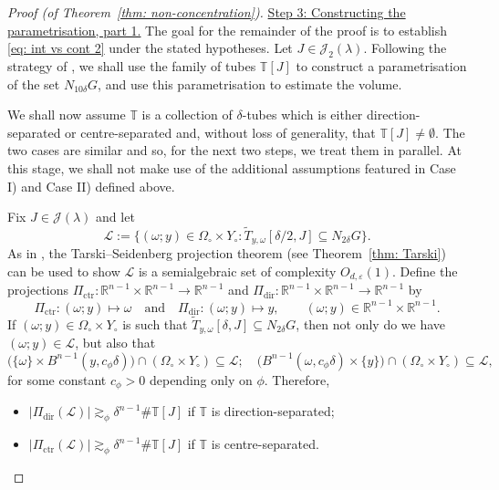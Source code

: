 \documentclass[reqno]{amsart}
\numberwithin{equation}{section}
\newcommand{\R}{\mathbb{R}}
\newcommand{\T}{\mathbb{T}}
\newcommand{\cJ}{\mathcal{J}}
\newcommand{\cL}{\mathcal{L}}
\theoremstyle{plain}
\theoremstyle{definition}
\newcommand{\ctr}{\mathrm{ctr}}
\newcommand{\dir}{\mathrm{dir}}
\begin{document}
\begin{proof}[Proof (of Theorem~\ref{thm: non-concentration})]



\noindent \underline{Step 3: Constructing the parametrisation, part 1.} The goal for the remainder of the proof is to establish \eqref{eq: int vs cont 2} under the stated hypotheses. Let $J\in \cJ_2(\lambda)$. Following the strategy of \cite{KR2018}, we shall use the family of tubes $\T[J]$ to construct a parametrisation of the set $N_{10\delta} G$, and use this parametrisation to estimate the volume. 

We shall now assume $\T$ is a collection of $\delta$-tubes which is either direction-separated or centre-separated and, without loss of generality, that $\T[J] \neq \emptyset$. The two cases are similar and so, for the next two steps, we treat them in parallel. At this stage, we shall not make use of the additional assumptions featured in Case I) and Case II) defined above. 

Fix $J \in \cJ(\lambda)$ and let
    \begin{equation*}
        \cL:=\big\{(\omega; y)\in \Omega_{\circ} \times Y_{\circ} : \widetilde{T}_{y,\omega}[\delta/2, J]\subseteq N_{2\delta} G\big\}.
    \end{equation*}
    As in \cite{KR2018}, the Tarski--Seidenberg projection theorem (see Theorem~\ref{thm: Tarski}) can be used to show $\cL$ is a semialgebraic set of complexity $O_{d, \varepsilon}(1)$. Define the projections $\Pi_{\ctr} \colon \R^{n-1} \times \R^{n-1} \to \R^{n-1}$ and $\Pi_{\dir} \colon \R^{n-1} \times \R^{n-1} \to \R^{n-1}$ by
    \begin{equation*}
     \Pi_{\ctr} \colon (\omega; y) \mapsto \omega \quad \textrm{and} \quad \Pi_{\dir} \colon (\omega; y) \mapsto y, \qquad  (\omega; y) \in  \R^{n-1} \times \R^{n-1}.
    \end{equation*}
    If $(\omega; y) \in \Omega_{\circ} \times Y_{\circ}$ is such that $\widetilde{T}_{y,\omega}[\delta, J] \subseteq N_{2\delta}G$, then not only do we have $(\omega; y)\in \cL$, but also that 
    \begin{equation*}
       \big(\{\omega\}\times B^{n-1}(y,c_\phi\delta)\big) \cap (\Omega_{\circ} \times Y_{\circ}) \subseteq \cL; \quad \big(B^{n-1}(\omega,c_\phi\delta)\times \{y\}\big) \cap (\Omega_{\circ} \times Y_{\circ}) \subseteq \cL, 
    \end{equation*}
    for some constant $c_\phi>0$ depending only on $\phi$. Therefore,
\begin{itemize}
    \item $|\Pi_{\dir}(\cL)|\gtrsim_{\phi} \delta^{n-1}\#\T[J]$ if $\T$ is direction-separated;\smallskip
    \item $|\Pi_{\ctr}(\cL)|\gtrsim_{\phi} \delta^{n-1} \#\T[J]$ if $\T$ is centre-separated.
\end{itemize}
    

\end{proof}
\end{document}
